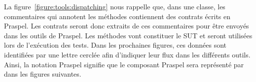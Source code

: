 La figure~\ref{figure:tools:dispatching} nous rappelle que, dans une classe, les
commentaires qui annotent les méthodes contiennent des contrats écrits en
Praspel. Les contrats seront donc extraits de ces commentaires pour être envoyés
dans les outils de Praspel. Les méthodes vont constituer le SUT et seront
utilisées lors de l'exécution des tests. Dans les prochaines figures, ces
données sont identifiées par une lettre cerclée afin d'indiquer leur flux dans
les différents outils. Ainsi, la notation Praspel  signifie que le composant Praspel
sera représenté par  dans les figures suivantes.

